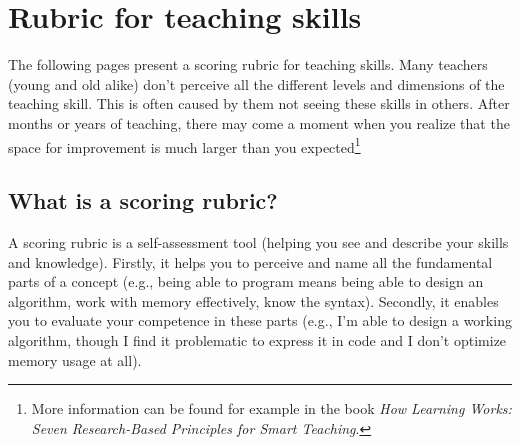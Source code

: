 
\newcommand{\rubriccriterion}[4]{
\stepcounter{rubricquestion}
\section*{\therubricquestion: #1}

\smallskip
\note{Unaware:} #2

\note{Beginner:} #3

\note{Guru:} #4

\medskip
\begin{tikzpicture}
\draw (0,0) -- (8,0);
\foreach \i in {0,1,...,8} %
{
\fill[black] (\i,0) circle (1.5 mm);
\fill[white] (\i,0) circle (1.4 mm);
}
\node at (0.15, -0.5) {unaware};
\node at (3, -0.5)    {beginner};
\node at (8, -0.5)    {guru};
\end{tikzpicture}
}

\restoregeometry
\chapter*{Rubric for teaching skills}
\label{rubric}

The following pages present a scoring rubric for teaching skills. Many teachers (young and old alike) don't perceive all the different levels and dimensions of the teaching skill. This is often caused by them not seeing these skills in others. After months or years of teaching, there may come a moment when you realize that the space for improvement is much larger than you expected\footnote{More information can be found for example in the book \emph{How Learning Works: Seven Research-Based Principles for Smart Teaching}.}

\section*{What is a scoring rubric?}

A scoring rubric is a self-assessment tool (helping you see and describe your skills and knowledge).
Firstly, it helps you to perceive and name all the fundamental parts of a concept (e.g., being able to program means being able to design an algorithm, work with memory effectively, know the syntax). Secondly, it enables you to evaluate your competence in these parts (e.g., I'm able to design a working algorithm, though I find it problematic to express it in code and I don't optimize memory usage at all).

